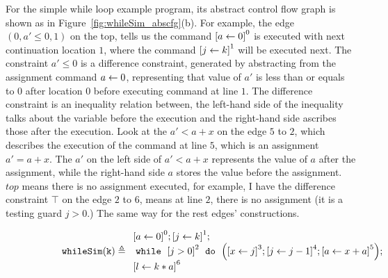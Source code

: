 \begin{example}
  \label{ex:whileSim_abscfg}
    For the simple while loop example program, 
its abstract control flow graph is shown as in Figure~\ref{fig:whileSim_abscfg}(b).
For example, the edge $(0, a' \leq 0, 1)$ on the top, tells us the command 
$\clabel{\assign{a}{0}}^0$ is executed with next continuation location $1$,
where the 
command $\clabel{\assign{j}{k}}^1$ will be executed next.
The constraint $a' \leq 0$ is a difference constraint, generated by abstracting from the assignment command $\assign{a}{0}$,
representing that value of $a'$ is less than or equals to $0$ after 
location $0$ before executing command at line $1$. The difference constraint is an inequality relation between, 
the left-hand side of the inequality talks about the variable before the execution and the right-hand side ascribes those after the execution. 
Look at the $a' < a+x $ on the edge $5$ to $2$, which describes the execution of the command at line $5$, 
which is an assignment $a' = a+x$. The $a'$ on the left side of $a' < a+x$ represents the value of $a$ after the assignment, while the right-hand side $a$ stores the value before the assignment. 
$top$ means there is no assignment executed, for example, I have the difference constraint $\top$ on the edge $2$ to $6$, 
means at line $2$, there is no assignment (it is a testing guard $j>0$.) 
%
The same way for the rest edges' constructions.
\begin{figure} 
  \centering
  \begin{subfigure}{.7\textwidth}
  \begin{centering}
  {\small
  $
  \kw{whileSim(k)} \triangleq
    \begin{array}{l}
        \clabel{ \assign{a}{0}}^{0} ;   
              \clabel{\assign{j}{k} }^{1} ;\\
              \ewhile ~ \clabel{j > 0}^{2} ~ \edo ~ 
              \Big(
               \clabel{\assign{x}{j} }^{3}  ;
               \clabel{\assign{j}{j-1}}^{4} ;
              \clabel{\assign{a}{x + a}}^{5}  \Big);\\
              \clabel{\assign{l}{k * a} }^{6}
          \end{array}
  $
  }
  \caption{}
  \end{centering}
  \end{subfigure}
    \begin{subfigure}{.45\textwidth}
    \begin{centering}
  \begin{tikzpicture}[scale=\textwidth/20cm,samples=200]

\end{tikzpicture}
\end{centering}
\end{subfigure}
\end{figure}
\end{example}

